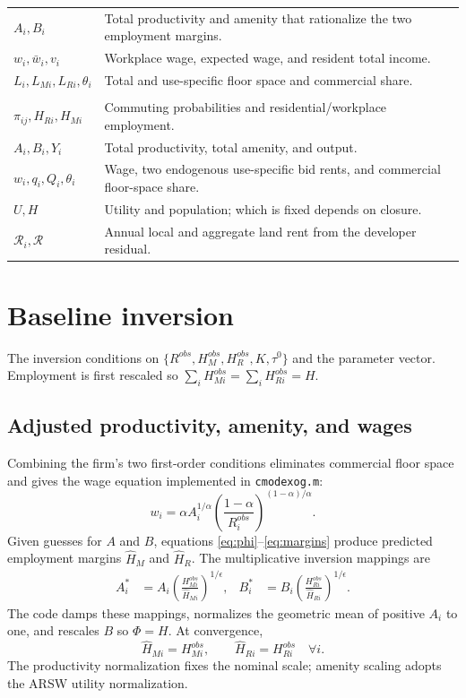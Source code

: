 \documentclass[11pt,a4paper]{article}
\newcommand{\Rland}{\mathcal{R}}
\begin{document}
\begin{longtable}{P{2.8cm}P{10.7cm}}
$A_i,B_i$ & Total productivity and amenity that rationalize the two employment margins.\\
$w_i,\bar w_i,v_i$ & Workplace wage, expected wage, and resident total income.\\
$L_i,L_{Mi},L_{Ri},\theta_i$ & Total and use-specific floor space and commercial share.\\
\addlinespace
{}\\
$\pi_{ij},H_{Ri},H_{Mi}$ & Commuting probabilities and residential/workplace employment.\\
$A_i,B_i,Y_i$ & Total productivity, total amenity, and output.\\
$w_i,q_i,Q_i,\theta_i$ & Wage, two endogenous use-specific bid rents, and commercial floor-space share.\\
$U,H$ & Utility and population; which is fixed depends on closure.\\
$\Rland_i,\Rland$ & Annual local and aggregate land rent from the developer residual.\\
\bottomrule
\end{longtable}
\normalsize

\section{Baseline inversion}
The inversion conditions on
$\{R^{obs},H_M^{obs},H_R^{obs},K,\tau^0\}$ and the parameter vector.
Employment is first rescaled so
$\sum_iH_{Mi}^{obs}=\sum_iH_{Ri}^{obs}=H$.

\subsection{Adjusted productivity, amenity, and wages}
Combining the firm's two first-order conditions eliminates commercial floor
space and gives the wage equation implemented in \texttt{cmodexog.m}:
\begin{equation}
 w_i=\alpha A_i^{1/\alpha}
 \left(\frac{1-\alpha}{R_i^{obs}}\right)^{(1-\alpha)/\alpha}. \label{eq:invwage}
\end{equation}
Given guesses for $A$ and $B$, equations
\eqref{eq:phi}--\eqref{eq:margins} produce predicted employment margins
$\widehat H_M$ and $\widehat H_R$. The multiplicative inversion mappings are
\begin{align}
 A_i^{*}&=A_i
 \left(\frac{H_{Mi}^{obs}}{\widehat H_{Mi}}\right)^{1/\epsilon},&
 B_i^{*}&=B_i
 \left(\frac{H_{Ri}^{obs}}{\widehat H_{Ri}}\right)^{1/\epsilon}. \label{eq:abupdate}
\end{align}
The code damps these mappings, normalizes the geometric mean of positive $A_i$
to one, and rescales $B$ so $\Phi=H$. At convergence,
\begin{equation}
 \widehat H_{Mi}=H_{Mi}^{obs},\qquad
 \widehat H_{Ri}=H_{Ri}^{obs}\quad\forall i.            \label{eq:invmargins}
\end{equation}
The productivity normalization fixes the nominal scale; amenity scaling adopts
the ARSW utility normalization.
\end{document}
